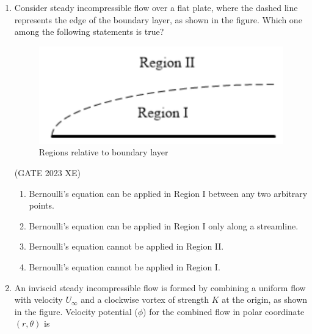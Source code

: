 \documentclass[journal,12pt,onecolumn]{IEEEtran}
\begin{document}
\begin{enumerate}
\item Consider steady incompressible flow over a flat plate, where the dashed line
represents the edge of the boundary layer, as shown in the figure. Which one among
the following statements is true?

\begin{figure}[htbp]
\centering
\includegraphics[width=0.75\columnwidth]{figs/B/fig4.png}
\caption{Regions relative to boundary layer}
\label{fig:figs/B/fig4.png}
\end{figure}
\hfill{(GATE 2023 XE)}
\begin{multicols}{2}
\begin{enumerate}
\item Bernoulli’s equation can be applied in Region I between any two arbitrary points.
\item Bernoulli’s equation can be applied in Region I only along a streamline.
\item Bernoulli’s equation cannot be applied in Region II.
\item Bernoulli’s equation cannot be applied in Region I.
\end{enumerate}
\end{multicols}

\item An inviscid steady incompressible flow is formed by combining a uniform flow with
velocity $U_\infty$ and a clockwise vortex of strength $K$ at the origin, as shown in the
figure. Velocity potential ($\phi$) for the combined flow in polar coordinate $(r,\theta)$ is


\end{enumerate}
\end{document}
